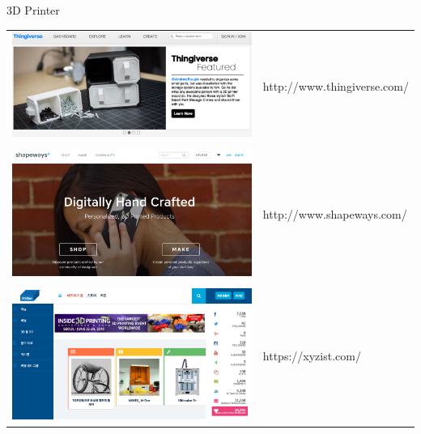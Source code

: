 \documentclass[11pt]{beamer}
\begin{document}
\begin{frame}[t]{3D Printer}\footnotesize
\begin{tabular}{c l}
\includegraphics[width=0.3\textheight]{./image/98_01.png}&http://www.thingiverse.com/\\ &\\
\includegraphics[width=0.3\textheight]{./image/98_02.png}&http://www.shapeways.com/\\ & \\
\includegraphics[width=0.3\textheight]{./image/98_03.png}&https://xyzist.com/
\end{tabular}
\end{frame}
\end{document}
